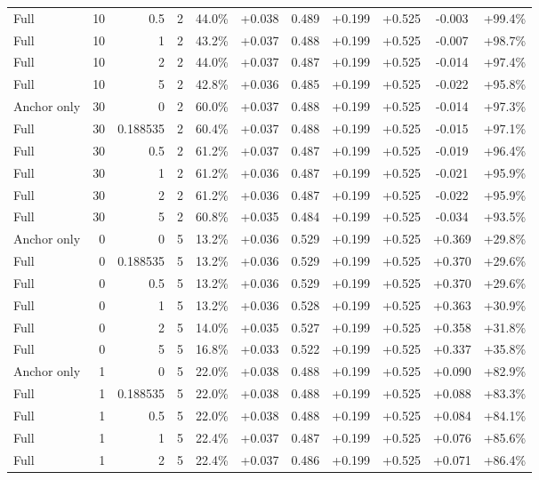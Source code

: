 \begin{table}[htbp]
\begin{tabular}{lrrrccccccc}
Full & 10 & 0.5 & 2 & 44.0\% & +0.038 & 0.489 & +0.199 & +0.525 & -0.003 & +99.4\% \\
Full & 10 & 1 & 2 & 43.2\% & +0.037 & 0.488 & +0.199 & +0.525 & -0.007 & +98.7\% \\
Full & 10 & 2 & 2 & 44.0\% & +0.037 & 0.487 & +0.199 & +0.525 & -0.014 & +97.4\% \\
Full & 10 & 5 & 2 & 42.8\% & +0.036 & 0.485 & +0.199 & +0.525 & -0.022 & +95.8\% \\
Anchor only & 30 & 0 & 2 & 60.0\% & +0.037 & 0.488 & +0.199 & +0.525 & -0.014 & +97.3\% \\
Full & 30 & 0.188535 & 2 & 60.4\% & +0.037 & 0.488 & +0.199 & +0.525 & -0.015 & +97.1\% \\
Full & 30 & 0.5 & 2 & 61.2\% & +0.037 & 0.487 & +0.199 & +0.525 & -0.019 & +96.4\% \\
Full & 30 & 1 & 2 & 61.2\% & +0.036 & 0.487 & +0.199 & +0.525 & -0.021 & +95.9\% \\
Full & 30 & 2 & 2 & 61.2\% & +0.036 & 0.487 & +0.199 & +0.525 & -0.022 & +95.9\% \\
Full & 30 & 5 & 2 & 60.8\% & +0.035 & 0.484 & +0.199 & +0.525 & -0.034 & +93.5\% \\
Anchor only & 0 & 0 & 5 & 13.2\% & +0.036 & 0.529 & +0.199 & +0.525 & +0.369 & +29.8\% \\
Full & 0 & 0.188535 & 5 & 13.2\% & +0.036 & 0.529 & +0.199 & +0.525 & +0.370 & +29.6\% \\
Full & 0 & 0.5 & 5 & 13.2\% & +0.036 & 0.529 & +0.199 & +0.525 & +0.370 & +29.6\% \\
Full & 0 & 1 & 5 & 13.2\% & +0.036 & 0.528 & +0.199 & +0.525 & +0.363 & +30.9\% \\
Full & 0 & 2 & 5 & 14.0\% & +0.035 & 0.527 & +0.199 & +0.525 & +0.358 & +31.8\% \\
Full & 0 & 5 & 5 & 16.8\% & +0.033 & 0.522 & +0.199 & +0.525 & +0.337 & +35.8\% \\
Anchor only & 1 & 0 & 5 & 22.0\% & +0.038 & 0.488 & +0.199 & +0.525 & +0.090 & +82.9\% \\
Full & 1 & 0.188535 & 5 & 22.0\% & +0.038 & 0.488 & +0.199 & +0.525 & +0.088 & +83.3\% \\
Full & 1 & 0.5 & 5 & 22.0\% & +0.038 & 0.488 & +0.199 & +0.525 & +0.084 & +84.1\% \\
Full & 1 & 1 & 5 & 22.4\% & +0.037 & 0.487 & +0.199 & +0.525 & +0.076 & +85.6\% \\
Full & 1 & 2 & 5 & 22.4\% & +0.037 & 0.486 & +0.199 & +0.525 & +0.071 & +86.4\% \\

\end{tabular}
\end{table}
